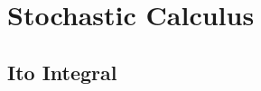 \documentclass[12pt]{article}
\theoremstyle{plain}
\theoremstyle{definition}
\theoremstyle{remark}
\begin{document}




\clearpage
\section{Stochastic Calculus}



\subsection{Ito Integral}
\end{document}
